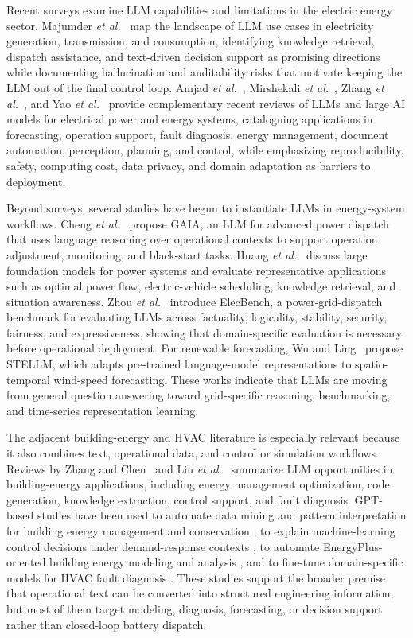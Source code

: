 \documentclass{ieeeaccess}
\begin{document}
Recent surveys examine LLM capabilities and limitations in the electric energy sector. Majumder \emph{et al.}~\cite{b4} map the landscape of LLM use cases in electricity generation, transmission, and consumption, identifying knowledge retrieval, dispatch assistance, and text-driven decision support as promising directions while documenting hallucination and auditability risks that motivate keeping the LLM out of the final control loop. Amjad \emph{et al.}~\cite{b6}, Mirshekali \emph{et al.}~\cite{b36}, Zhang \emph{et al.}~\cite{b43}, and Yao \emph{et al.}~\cite{b44} provide complementary recent reviews of LLMs and large AI models for electrical power and energy systems, cataloguing applications in forecasting, operation support, fault diagnosis, energy management, document automation, perception, planning, and control, while emphasizing reproducibility, safety, computing cost, data privacy, and domain adaptation as barriers to deployment.

Beyond surveys, several studies have begun to instantiate LLMs in energy-system workflows. Cheng \emph{et al.}~\cite{b5} propose GAIA, an LLM for advanced power dispatch that uses language reasoning over operational contexts to support operation adjustment, monitoring, and black-start tasks. Huang \emph{et al.}~\cite{b37} discuss large foundation models for power systems and evaluate representative applications such as optimal power flow, electric-vehicle scheduling, knowledge retrieval, and situation awareness. Zhou \emph{et al.}~\cite{b38} introduce ElecBench, a power-grid-dispatch benchmark for evaluating LLMs across factuality, logicality, stability, security, fairness, and expressiveness, showing that domain-specific evaluation is necessary before operational deployment. For renewable forecasting, Wu and Ling~\cite{b53} propose STELLM, which adapts pre-trained language-model representations to spatio-temporal wind-speed forecasting. These works indicate that LLMs are moving from general question answering toward grid-specific reasoning, benchmarking, and time-series representation learning.

The adjacent building-energy and HVAC literature is especially relevant because it also combines text, operational data, and control or simulation workflows. Reviews by Zhang and Chen~\cite{b45} and Liu \emph{et al.}~\cite{b46} summarize LLM opportunities in building-energy applications, including energy management optimization, code generation, knowledge extraction, control support, and fault diagnosis. GPT-based studies have been used to automate data mining and pattern interpretation for building energy management and conservation \cite{b47}, to explain machine-learning control decisions under demand-response contexts \cite{b48}, to automate EnergyPlus-oriented building energy modeling and analysis \cite{b39,b49,b50,b51}, and to fine-tune domain-specific models for HVAC fault diagnosis \cite{b52}. These studies support the broader premise that operational text can be converted into structured engineering information, but most of them target modeling, diagnosis, forecasting, or decision support rather than closed-loop battery dispatch.
\end{document}
